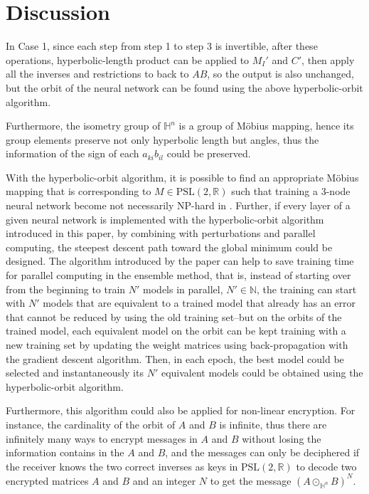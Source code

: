 \documentclass{article}
\theoremstyle{plain}
\theoremstyle{plain} %
\theoremstyle{definition}  %
\theoremstyle{remark}  %
\theoremstyle{plain}
\begin{document}
\section{Discussion}
In Case 1, since each step from step 1 to step 3 is invertible, after these operations, hyperbolic-length product can be applied to $M_I'$ and $C'$, then apply all the inverses and restrictions to back to $AB$, so the output is also unchanged, but the orbit of the neural network can be found using the above hyperbolic-orbit algorithm. 

Furthermore, the isometry group of $\mathbb{H}^n$ is a group of M\"{o}bius mapping, hence its group elements preserve not only hyperbolic length but angles, thus the information of the sign of each $a_{ki}b_{il}$ could be preserved.

With the hyperbolic-orbit algorithm, it is possible to find an appropriate M\"{o}bius mapping that is corresponding to $M\in\text{PSL}(2,\mathbb{R})$ such that training a 3-node neural network become not necessarily NP-hard in \cite{blum1988training}. Further, if every layer of a given neural network is implemented with the hyperbolic-orbit algorithm introduced in this paper, by combining with perturbations and parallel computing, the steepest descent path toward the global minimum could be designed. The algorithm introduced by the paper can help to save training time for parallel computing in the ensemble method, that is, instead of starting over from the beginning to train $N'$ models in parallel, $N'\in\mathbb{N}$, the training can start with $N'$ models that are equivalent to a trained model that already has an error that cannot be reduced by using the old training set--but on the orbits of the trained model, each equivalent model on the orbit can be kept training with a new training set by updating the weight matrices using back-propagation with the gradient descent algorithm. Then, in each epoch, the best model could be selected and instantaneously its $N'$ equivalent models could be obtained using the hyperbolic-orbit algorithm.

Furthermore, this algorithm could also be applied for non-linear encryption. For instance, the cardinality of the orbit of $A$ and $B$ is infinite, thus there are infinitely many ways to encrypt messages in $A$ and $B$ without losing the information contains in the $A$ and $B$, and the messages can only be deciphered if the receiver knows the two correct inverses as keys in $\text{PSL}(2,\mathbb{R})$ to decode two encrypted matrices $A$ and $B$ and an integer $N$ to get the message $(A\odot_{\mathbb{H}^n} B)^N$.
\end{document}
